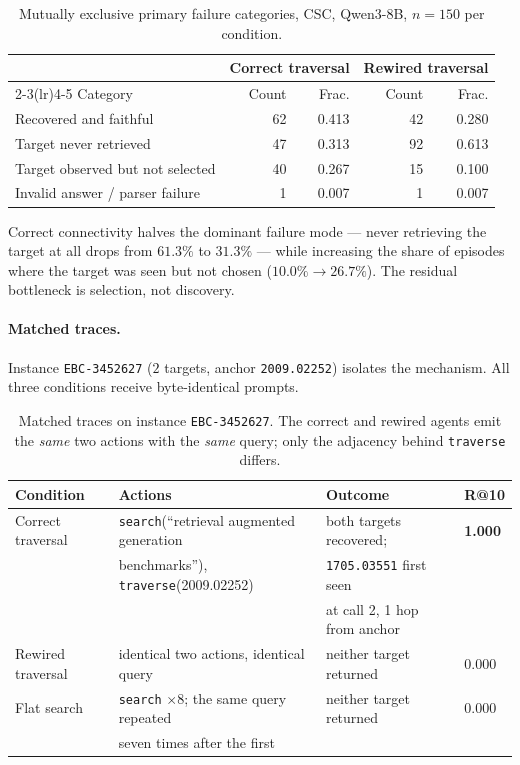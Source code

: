 \begin{table}[t]
\centering
\small
\caption{Mutually exclusive primary failure categories, CSC, Qwen3-8B, $n{=}150$ per condition.}
\label{tab:ar-failures}
\begin{tabular}{lrrrr}
\toprule
& \multicolumn{2}{c}{Correct traversal} & \multicolumn{2}{c}{Rewired traversal} \\
\cmidrule(lr){2-3}\cmidrule(lr){4-5}
Category & Count & Frac. & Count & Frac. \\
\midrule
Recovered and faithful & 62 & 0.413 & 42 & 0.280 \\
Target never retrieved & 47 & 0.313 & 92 & 0.613 \\
Target observed but not selected & 40 & 0.267 & 15 & 0.100 \\
Invalid answer / parser failure & 1 & 0.007 & 1 & 0.007 \\
\bottomrule
\end{tabular}
\end{table}

Correct connectivity halves the dominant failure mode — never retrieving the target at all drops
from $61.3\%$ to $31.3\%$ — while increasing the share of episodes where the target was seen but not
chosen ($10.0\%\rightarrow26.7\%$). The residual bottleneck is selection, not discovery.

\paragraph{Matched traces.} Instance \texttt{EBC-3452627} ($2$ targets, anchor
\texttt{2009.02252}) isolates the mechanism. All three conditions receive byte-identical prompts.

\begin{table}[t]
\centering
\small
\caption{Matched traces on instance \texttt{EBC-3452627}. The correct and rewired agents emit the
\emph{same} two actions with the \emph{same} query; only the adjacency behind \texttt{traverse}
differs.}
\label{tab:ar-traces}
\begin{tabular}{llll}
\toprule
Condition & Actions & Outcome & R@10 \\
\midrule
Correct traversal & \texttt{search}(``retrieval augmented generation & both targets recovered; & \textbf{1.000} \\
 & \quad benchmarks''), \texttt{traverse}(2009.02252) & \texttt{1705.03551} first seen & \\
 & & at call 2, 1 hop from anchor & \\
\addlinespace
Rewired traversal & identical two actions, identical query & neither target returned & 0.000 \\
\addlinespace
Flat search & \texttt{search} $\times 8$; the same query repeated & neither target returned & 0.000 \\
 & seven times after the first & & \\
\bottomrule
\end{tabular}
\end{table}

